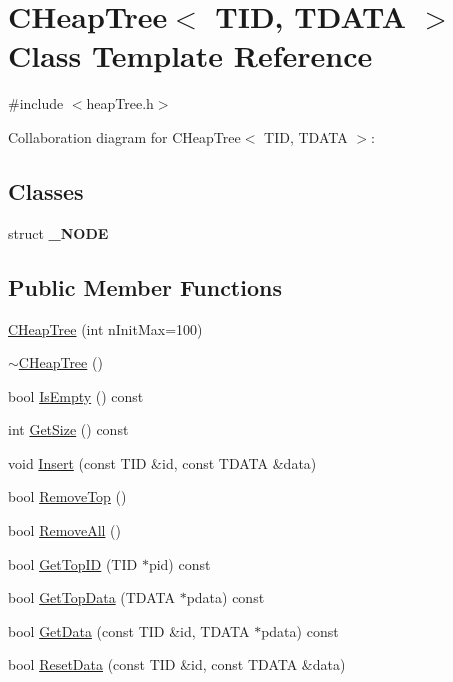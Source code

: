 \hypertarget{classCHeapTree}{
\section{CHeapTree$<$ TID, TDATA $>$ Class Template Reference}
\label{classCHeapTree}
}


{\ttfamily \#include $<$heapTree.h$>$}



Collaboration diagram for CHeapTree$<$ TID, TDATA $>$:
\subsection*{Classes}
\begin{DoxyCompactItemize}
\item 
struct {\bfseries \_\-NODE}
\end{DoxyCompactItemize}
\subsection*{Public Member Functions}
\begin{DoxyCompactItemize}
\item 
\hyperlink{classCHeapTree_a69014f29dff41b8a994e9e22e155ff10}{CHeapTree} (int nInitMax=100)
\item 
\hyperlink{classCHeapTree_a376e2b94d5a1333a721eb6940f113202}{$\sim$CHeapTree} ()
\item 
bool \hyperlink{classCHeapTree_a832c197b6babfe4b094e4dd56959d3d5}{IsEmpty} () const 
\item 
int \hyperlink{classCHeapTree_a2fd838d2387b6ab096e0d24e311389f6}{GetSize} () const 
\item 
void \hyperlink{classCHeapTree_ab46d24bd33f9d97d120e62f2bf05be20}{Insert} (const TID \&id, const TDATA \&data)
\item 
bool \hyperlink{classCHeapTree_a7a6e130f6fb97782d01892f881efd901}{RemoveTop} ()
\item 
bool \hyperlink{classCHeapTree_a3c835d17270d03dc933faa4fb94c02fb}{RemoveAll} ()
\item 
bool \hyperlink{classCHeapTree_a6adf63dfbfeab2129421792963a798f7}{GetTopID} (TID $\ast$pid) const 
\item 
bool \hyperlink{classCHeapTree_ad2216b6199569bb3872b8881dbbd287c}{GetTopData} (TDATA $\ast$pdata) const 
\item 
bool \hyperlink{classCHeapTree_a93f174c44507c428d491eac76f9be18f}{GetData} (const TID \&id, TDATA $\ast$pdata) const 
\item 
bool \hyperlink{classCHeapTree_a4fed05db5fa97df8816bbebd1b73ed3b}{ResetData} (const TID \&id, const TDATA \&data)
\end{DoxyCompactItemize}
